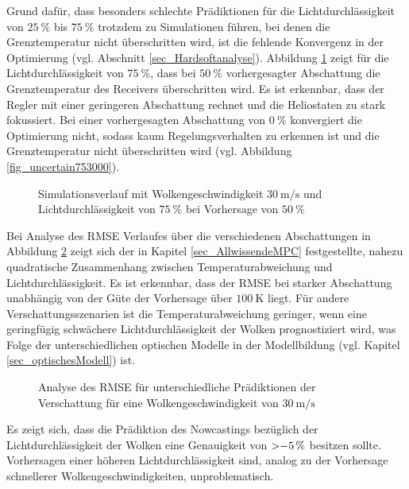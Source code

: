Grund dafür, dass besonders schlechte Prädiktionen für die Lichtdurchlässigkeit von $\SI{25}{\percent}$ bis $\SI{75}{\percent}$ trotzdem zu Simulationen führen, bei denen die Grenztemperatur nicht überschritten wird, ist die fehlende Konvergenz in der Optimierung (vgl. Abschnitt \ref{sec_Hardsoftanalyse}).
Abbildung \ref{fig_uncertain753050} zeigt für die Lichtdurchlässigkeit von $\SI{75}{\percent}$, dass bei $\SI{50}{\percent}$ vorhergesagter Abschattung die Grenztemperatur des Receivers überschritten wird.
Es ist erkennbar, dass der Regler mit einer geringeren Abschattung rechnet und die Heliostaten zu stark fokussiert.
Bei einer vorhergesagten Abschattung von $\SI{0}{\percent}$ konvergiert die Optimierung nicht, sodass kaum Regelungsverhalten zu erkennen ist und die Grenztemperatur nicht überschritten wird (vgl. Abbildung \ref{fig_uncertain753000}).

\begin{figure}[h!]
    \centering
    \setlength{\fboxsep}{1pt}
    \setlength{\fboxrule}{1pt}
    \caption[Simulationsverlauf mit Wolkengeschwindigkeit $\SI{30}{\metre\per\second}$ und Lichtdurchlässigkeit von $\SI{75}{\percent}$ bei Vorhersage von $\SI{50}{\percent}$]{Simulationsverlauf mit Wolkengeschwindigkeit $\SI{30}{\metre\per\second}$ und Lichtdurchlässigkeit von $\SI{75}{\percent}$ bei Vorhersage von $\SI{50}{\percent}$}
    \label{fig_uncertain753050}
\end{figure}

Bei Analyse des RMSE Verlaufes über die verschiedenen Abschattungen in Abbildung \ref{fig_shadingrmse} zeigt sich der in Kapitel \ref{sec_AllwissendeMPC} festgestellte, nahezu quadratische Zusammenhang zwischen Temperaturabweichung und Lichtdurchlässigkeit.
Es ist erkennbar, dass der RMSE bei starker Abschattung unabhängig von der Güte der Vorhersage über $\SI{100}{\kelvin}$ liegt.
Für andere Verschattungsszenarien ist die Temperaturabweichung geringer, wenn eine geringfügig schwächere Lichtdurchlässigkeit der Wolken prognostiziert wird, was Folge der unterschiedlichen optischen Modelle in der Modellbildung (vgl. Kapitel \ref{sec_optischesModell}) ist.

\begin{figure}[t]
    \centering
    \setlength{\fboxsep}{1pt}
    \setlength{\fboxrule}{1pt}
    \caption[Analyse des RMSE für unterschiedliche Prädiktionen der Verschattung für eine Wolkengeschwindigkeit von $\SI{30}{\metre\per\second}$]{Analyse des RMSE für unterschiedliche Prädiktionen der Verschattung für eine Wolkengeschwindigkeit von $\SI{30}{\metre\per\second}$}
    \label{fig_shadingrmse}
\end{figure}

Es zeigt sich, dass die Prädiktion des Nowcastings bezüglich der Lichtdurchlässigkeit der Wolken eine Genauigkeit von $\SI{>-5}{\percent}$ besitzen sollte.
Vorhersagen einer höheren Lichtdurchlässigkeit sind, analog zu der Vorhersage schnellerer Wolkengeschwindigkeiten, unproblematisch.
